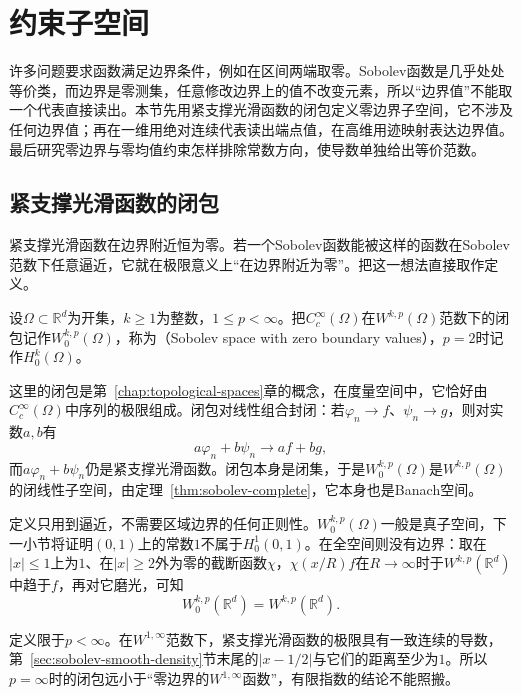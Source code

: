 \section{约束子空间}
\label{sec:sobolev-constrained-subspaces}

许多问题要求函数满足边界条件，例如在区间两端取零。Sobolev函数是几乎处处等价类，而边界是零测集，任意修改边界上的值不改变元素，所以“边界值”不能取一个代表直接读出。本节先用紧支撑光滑函数的闭包定义零边界子空间，它不涉及任何边界值；再在一维用绝对连续代表读出端点值，在高维用迹映射表达边界值。最后研究零边界与零均值约束怎样排除常数方向，使导数单独给出等价范数。

\subsection{紧支撑光滑函数的闭包}
\label{sec:sobolev-compact-closure}

紧支撑光滑函数在边界附近恒为零。若一个Sobolev函数能被这样的函数在Sobolev范数下任意逼近，它就在极限意义上“在边界附近为零”。把这一想法直接取作定义。

\begin{definition}[零边界Sobolev空间]
\label{def:sobolev-w0}
设$\Omega\subset\mathbb R^d$为开集，$k\geq1$为整数，$1\leq p<\infty$。把$C_c^\infty(\Omega)$在$W^{k,p}(\Omega)$范数下的闭包记作$W_0^{k,p}(\Omega)$，称为（Sobolev space with zero boundary values），$p=2$时记作$H_0^k(\Omega)$。
\end{definition}

这里的闭包是第~\ref{chap:topological-spaces}章的概念，在度量空间中，它恰好由$C_c^\infty(\Omega)$中序列的极限组成。闭包对线性组合封闭：若$\varphi_n\to f$、$\psi_n\to g$，则对实数$a,b$有
\[
a\varphi_n+b\psi_n\to af+bg,
\]
而$a\varphi_n+b\psi_n$仍是紧支撑光滑函数。闭包本身是闭集，于是$W_0^{k,p}(\Omega)$是$W^{k,p}(\Omega)$的闭线性子空间，由定理~\ref{thm:sobolev-complete}，它本身也是Banach空间。

定义只用到逼近，不需要区域边界的任何正则性。$W_0^{k,p}(\Omega)$一般是真子空间，下一小节将证明$(0,1)$上的常数$1$不属于$H_0^1(0,1)$。在全空间则没有边界：取在$|x|\leq1$上为$1$、在$|x|\geq2$外为零的截断函数$\chi$，$\chi(x/R)f$在$R\to\infty$时于$W^{k,p}(\mathbb R^d)$中趋于$f$，再对它磨光，可知
\[
W_0^{k,p}(\mathbb R^d)=W^{k,p}(\mathbb R^d).
\]

定义限于$p<\infty$。在$W^{1,\infty}$范数下，紧支撑光滑函数的极限具有一致连续的导数，第~\ref{sec:sobolev-smooth-density}节末尾的$|x-1/2|$与它们的距离至少为$1$。所以$p=\infty$时的闭包远小于“零边界的$W^{1,\infty}$函数”，有限指数的结论不能照搬。

